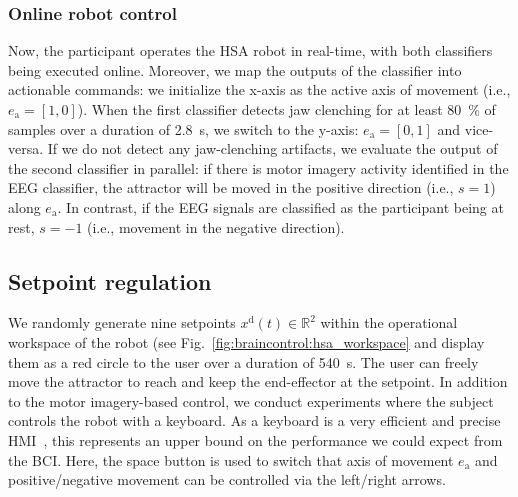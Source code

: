 \subsubsection{Online robot control}
Now, the participant operates the HSA robot in real-time, with both classifiers being executed online.
Moreover, we map the outputs of the classifier into actionable commands: we initialize the x-axis as the active axis of movement (i.e., $e_\mathrm{a} = [1,0]$). When the first classifier detects jaw clenching for at least \SI{80}{\percent} of samples over a duration of \SI{2.8}{s}, we switch to the y-axis: $e_\mathrm{a} = [0,1]$ and vice-versa. If we do not detect any jaw-clenching artifacts, we evaluate the output of the second classifier in parallel: if there is motor imagery activity identified in the \gls{EEG} classifier, the attractor will be moved in the positive direction (i.e., $s=1$) along $e_\mathrm{a}$. In contrast, if the \gls{EEG} signals are classified as the participant being at rest, $s=-1$ (i.e., movement in the negative direction).


\subsection{Setpoint regulation}\label{sub:braincontrol:experiments:setpoint_regulation}
We randomly generate nine setpoints $x^\mathrm{d}(t) \in \mathbb{R}^2$ within the operational workspace of the robot (see Fig.~\ref{fig:braincontrol:hsa_workspace} and display them as a red circle to the user over a duration of \SI{540}{s}.
The user can freely move the attractor to reach and keep the end-effector at the setpoint.
In addition to the motor imagery-based control, we conduct experiments where the subject controls the robot with a keyboard.
As a keyboard is a very efficient and precise \gls{HMI}~\citep{vasiljevic2016case, mahmud2020interface}, this represents an upper bound on the performance we could expect from the \gls{BCI}.
Here, the space button is used to switch that axis of movement $e_\mathrm{a}$ and positive/negative movement can be controlled via the left/right arrows.

